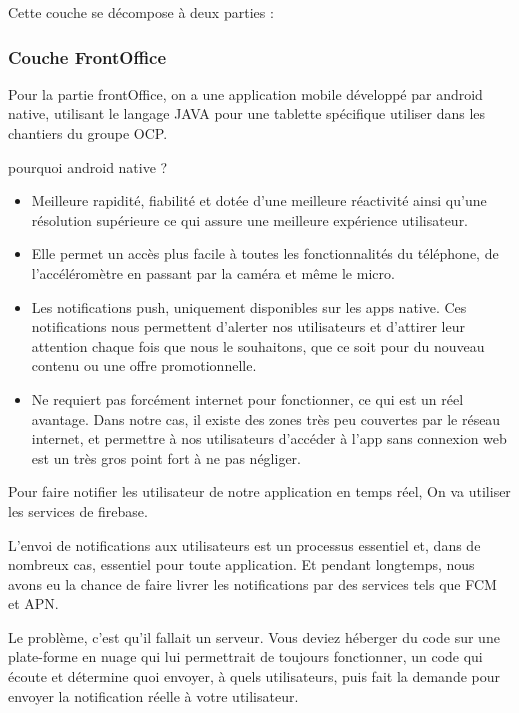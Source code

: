 Cette couche se d\'ecompose \`a deux parties :

\subsubsection{Couche FrontOffice}

Pour la partie frontOffice, on a une application mobile d\'evelopp\'e par android native, utilisant le langage JAVA pour une tablette sp\'ecifique utiliser dans les chantiers du groupe \gls{OCP}. 

pourquoi android native ? 

\begin{itemize}
\item Meilleure rapidit\'e, fiabilit\'e et dot\'ee d'une meilleure r\'eactivit\'e ainsi qu'une r\'esolution sup\'erieure ce qui assure une meilleure exp\'erience utilisateur.
\item Elle permet un acc\`es plus facile \`a toutes les fonctionnalit\'es du t\'el\'ephone, de l'acc\'el\'erom\`etre en passant par la cam\'era et m\^eme le micro.
\item Les notifications push, uniquement disponibles sur les apps native. Ces notifications nous permettent d'alerter nos utilisateurs et d'attirer leur attention chaque fois que nous le souhaitons, que ce soit pour du nouveau contenu ou une offre promotionnelle.
\item Ne requiert pas forc\'ement internet pour fonctionner, ce qui est un r\'eel avantage. Dans notre cas, il existe des zones tr\`es peu couvertes par le r\'eseau internet, et permettre \`a nos utilisateurs d'acc\'eder \`a l'app sans connexion web est un tr\`es gros point fort \`a ne pas n\'egliger.
\end{itemize}

Pour faire notifier les utilisateur de notre application en temps r\'eel, On va utiliser les services de firebase.

L'envoi de notifications aux utilisateurs est un processus essentiel et, dans de nombreux cas, essentiel pour toute application. Et pendant longtemps, nous avons eu la chance de faire livrer les notifications par des services tels que FCM et APN.

Le probl\`eme, c'est qu'il fallait un serveur. Vous deviez h\'eberger du code sur une plate-forme en nuage qui lui permettrait de toujours fonctionner, un code qui \'ecoute et d\'etermine quoi envoyer, \`a quels utilisateurs, puis fait la demande pour envoyer la notification r\'eelle \`a votre utilisateur.

